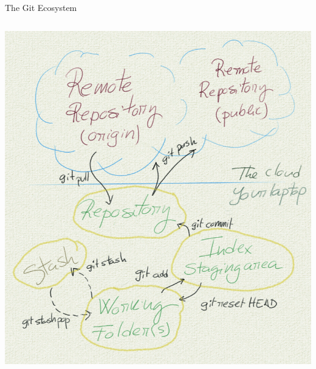 \begin{frame}[t,fragile]{The Git Ecosystem}
\begin{columns}
\begin{center}
        \includegraphics[angle=0,width=0.8\linewidth]{./Figs/git_scheme.png}
      \end{center}
    \end{columns}
  
\end{frame}
